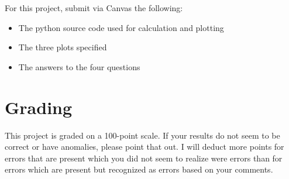 \documentclass[12pt]{article}
\begin{document}
For this project, submit via Canvas the following:

\begin{itemize}
   \item The python source code used for calculation and plotting
   \item The three plots specified
   \item The answers to the four questions
\end{itemize}

\section*{\textsf{Grading}}

This project is graded on a 100-point scale.  If your results do not seem to be
correct or have anomalies, please point that out.  I will deduct more points for
errors that are present which you did not seem to realize were errors than for
errors which are present but recognized as errors based on your comments.
\end{document}
